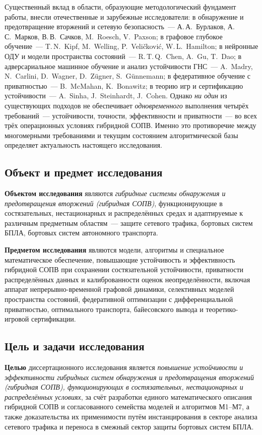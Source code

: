 \documentclass[12pt,a5paper]{article}
\begin{document}
Существенный вклад в области, образующие методологический
фундамент работы, внесли отечественные и зарубежные
исследователи: в обнаружение и предотвращение вторжений и
сетевую безопасность~--- А.\,А.~Бурлаков, А.\,С.~Марков,
В.\,В.~Сачков, M.~Roesch, V.~Paxson; в графовое глубокое
обучение~--- T.\,N.~Kipf, M.~Welling, P.~Veli\v{c}kovi\'{c},
W.\,L.~Hamilton; в нейронные ОДУ и модели пространства
состояний~--- R.\,T.\,Q.~Chen, A.~Gu, T.~Dao; в адверсариальное
машинное обучение и анализ устойчивости ГНС~--- A.~Madry,
N.~Carlini, D.~Wagner, D.~Z\"ugner, S.~G\"unnemann; в
федеративное обучение с приватностью~--- B.~McMahan,
K.~Bonawitz; в теорию игр и сертификацию устойчивости~---
A.~Sinha, J.~Steinhardt, J.~Cohen. Однако \emph{ни один} из
существующих подходов не обеспечивает \emph{одновременного}
выполнения четырёх требований~--- устойчивости, точности,
эффективности и приватности~--- во всех трёх операционных
условиях гибридной СОПВ. Именно это противоречие между
многомерными требованиями и текущим состоянием алгоритмической
базы определяет актуальность настоящего исследования.

\subsection*{Объект и предмет исследования}

\textbf{Объектом исследования} являются \emph{гибридные
системы обнаружения и предотвращения вторжений (гибридная
СОПВ)}, функционирующие в состязательных, нестационарных и
распределённых средах и адаптируемые к различным предметным
областям~--- защите сетевого трафика, бортовых систем БПЛА,
бортовых систем автономного транспорта.

\textbf{Предметом исследования} являются модели, алгоритмы и
специальное математическое обеспечение, повышающие
устойчивость и эффективность гибридной СОПВ при сохранении
состязательной устойчивости, приватности распределённых
данных и калиброванности оценок неопределённости, включая
аппарат непрерывно-временной графовой динамики, селективных
моделей пространства состояний, федеративной оптимизации с
дифференциальной приватностью, оптимального транспорта,
байесовского вывода и теоретико-игровой сертификации.

\subsection*{Цель и задачи исследования}

\textbf{Целью} диссертационного исследования является
\emph{повышение устойчивости и эффективности гибридных
систем обнаружения и предотвращения вторжений (гибридная
СОПВ), функционирующих в состязательных, нестационарных и
распределённых условиях}, за счёт разработки единого
математического описания гибридной СОПВ и согласованного
семейства моделей и алгоритмов М1--М7, а также доказательства
их применимости путём инстанцирования в секторе анализа
сетевого трафика и переноса в смежный сектор защиты бортовых
систем БПЛА.
\end{document}
